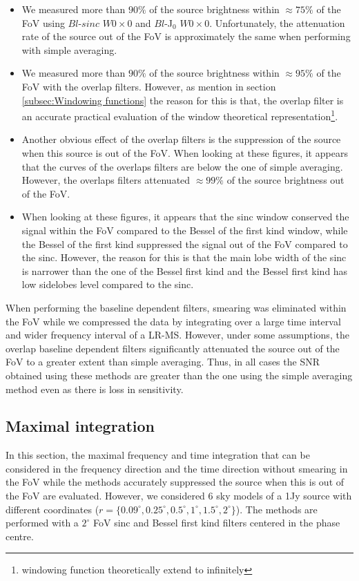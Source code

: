 \documentclass[useAMS,usenatbib]{mn2e}
\begin{document}
\begin{itemize}
 \item We measured more than $90\%$ of the source brightness within $\approx 75\%$ of the FoV using $Bl$-$sinc$ $W0 \times 0$ and 
      $Bl$-J$_0$ $W0\times0$. Unfortunately, the attenuation rate of the source out of the FoV is approximately the same when performing 
with simple averaging.
 \item We measured more than $90\%$ of the source brightness within $\approx 95\%$ of the FoV with the overlap filters. However, as mention 
in section \ref{subsec:Windowing functions} the reason for this is that, the overlap filter is an accurate practical evaluation of the 
window theoretical representation\footnote{windowing function theoretically extend to infinitely}. 
 \item Another obvious effect of the overlap filters is the suppression of the source when this source is out of the FoV. When
looking at these figures, it appears that the curves of the overlaps filters are below the one of simple averaging.  However, the overlaps 
filters attenuated $\approx 99\%$ of the source brightness out of the FoV.
  \item  When
looking at these figures, it appears that the sinc window conserved the signal within the FoV compared to the Bessel of the 
first kind window, while the Bessel of the first kind suppressed the signal out of the FoV compared to the sinc. However, the reason for 
this is that
the main lobe width of the sinc is narrower than the one of the Bessel first kind and the Bessel first kind has low 
sidelobes level compared to the sinc.
\end{itemize}
When performing the baseline dependent filters, smearing was eliminated within the FoV while we compressed 
the data by integrating over a large time interval and wider frequency interval of a LR-MS. However, under some assumptions,
the overlap baseline dependent filters significantly attenuated the source  out of the FoV  to a greater extent than simple averaging. Thus,
in all cases the SNR obtained using these methods are greater than the one using the simple averaging method even as there is loss in 
sensitivity.
\subsection{Maximal integration}
In this section, the maximal frequency and time integration that can be considered in the frequency direction and the time 
direction without smearing in the FoV while the methods accurately suppressed the source when this is out of the FoV are evaluated. 
However, 
we considered $6$ sky models of a 1Jy source with different coordinates ($r=\{0.09^\circ,0.25^\circ,0.5^\circ,1^\circ,1.5^\circ, 
2^\circ\}$). The methods are performed with a $2^\circ$ FoV sinc and Bessel first kind filters centered in the phase centre.
\end{document}
